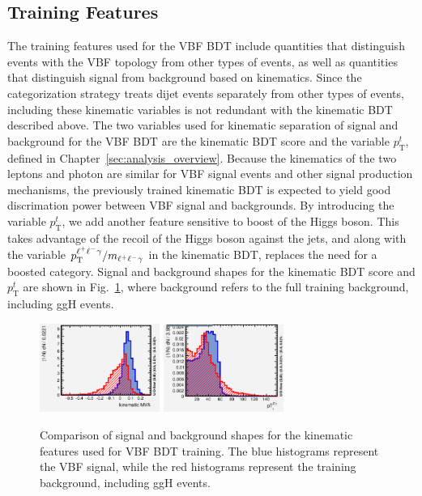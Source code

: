 \subsection{Training Features}
The training features used for the VBF BDT include quantities that distinguish events with the VBF topology from other types of events, as well as quantities that 
distinguish signal from background based on kinematics. Since the categorization strategy treats dijet events separately from other types of events, including these 
kinematic variables is not redundant with the kinematic BDT described above. The two variables used for kinematic separation of signal and background for the VBF BDT are 
the kinematic BDT score and the variable $p_{\mathrm{T}}^{t}$, defined in Chapter~\ref{sec:analysis_overview}. Because the kinematics of the two leptons and photon are 
similar for VBF signal events and other signal production mechanisms, the previously trained kinematic BDT is expected to yield good discrimation power between VBF signal and backgrounds. 
By introducing the variable $p_{\mathrm{T}}^{t}$, we add another feature sensitive to boost of the Higgs boson. This takes advantage of the recoil of the Higgs boson against the jets, and along 
with the variable $p_{\mathrm{T}}^{\ell^{+}\ell^{-}\gamma}/m_{\ell^{+}\ell^{-}\gamma}$ in the kinematic BDT, replaces the need for a boosted category. Signal and background shapes for the kinematic BDT score and $p_{\mathrm{T}}^{t}$ are shown in Fig.~\ref{fig:kin_bdt_ptt}, where background refers to the full training background, including ggH \hzg{} events.

\begin{figure}[tb]
	\begin{center}
		\includegraphics[width=0.35\textwidth]{fig/MVA/kin_bdt_vbf_training.png}
		\includegraphics[width=0.35\textwidth]{fig/MVA/ptt_vbf_training.png}
	\end{center}
	\caption{Comparison of signal and background shapes for the kinematic features used for VBF BDT training. The blue histograms represent the VBF signal, while the red histograms represent the training background, including ggH \hzg{} events.}
	\label{fig:kin_bdt_ptt}
\end{figure}

